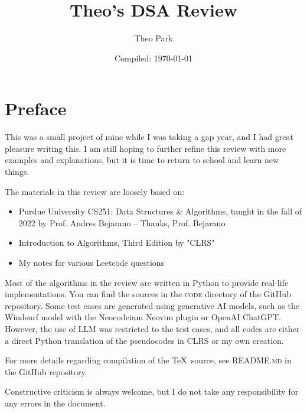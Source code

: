 \documentclass{report}
\title{Theo's DSA Review}
\author{Theo Park}
\date{Compiled: \today}
\begin{document}
\maketitle

\pagestyle{fancy}


\tableofcontents

\chapter*{Preface}

\noindent This was a small project of mine while I was taking a gap year, and I had great pleasure writing this.
I am still hoping to further refine this review with more examples and explanations, but it is time to return to school and learn new things.

\noindent The materials in this review are loosely based on:

\begin{itemize}
  \item Purdue University CS251: Data Structures \& Algorithms, taught in the fall of 2022 by Prof. Andres Bejarano -- Thanks, Prof. Bejarano
  \item Introduction to Algorithms, Third Edition by "CLRS"
  \item My notes for various Leetcode questions
\end{itemize}

\noindent Most of the algorithms in the review are written in Python to provide real-life implementations.
You can find the sources in the \textsc{code} directory of the GitHub repository.
Some test cases are generated using generative AI models, such as the Windsurf model with the Neocodeium Neovim plugin or OpenAI ChatGPT.
However, the use of LLM was restricted to the test cases, and all codes are either a direct Python translation of the pseudocodes in CLRS or my own creation.

\noindent For more details regarding compilation of the \TeX\ source, see \textsc{README.md} in the GitHub repository.

\noindent Constructive criticism is always welcome, but I do not take any responsibility for any errors in the document.
\end{document}
